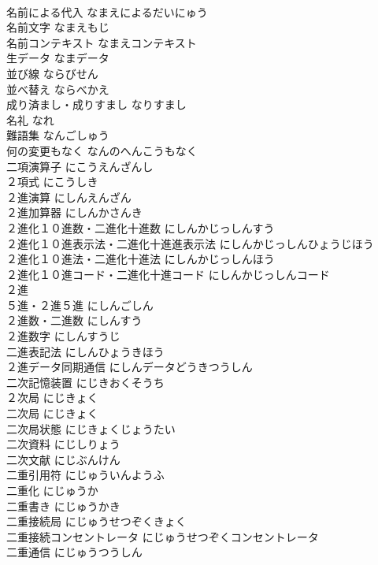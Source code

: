 \documentclass[8pt]{extreport}
\begin{document}
\begin{CJK}{UTF8}{min}
\\	名前による代入	なまえによるだいにゅう	
\\	名前文字	なまえもじ	
\\	名前コンテキスト	なまえコンテキスト	
\\	生データ	なまデータ	
\\	並び線	ならびせん	
\\	並べ替え	ならべかえ	
\\	成り済まし・成りすまし	なりすまし	
\\	名礼	なれ	
\\	難語集	なんごしゅう	
\\	何の変更もなく	なんのへんこうもなく	
\\	二項演算子	にこうえんざんし	
\\	２項式	にこうしき	
\\	２進演算	にしんえんざん	
\\	２進加算器	にしんかさんき	
\\	２進化１０進数・二進化十進数	にしんかじっしんすう	
\\	２進化１０進表示法・二進化十進進表示法	にしんかじっしんひょうじほう	
\\	２進化１０進法・二進化十進法	にしんかじっしんほう	
\\	２進化１０進コード・二進化十進コード	にしんかじっしんコード	
\\	２進
\\	５進・２進５進	にしんごしん	
\\	２進数・二進数	にしんすう	
\\	２進数字	にしんすうじ	
\\	二進表記法	にしんひょうきほう	
\\	２進データ同期通信	にしんデータどうきつうしん	
\\	二次記憶装置	にじきおくそうち	
\\	２次局	にじきょく	
\\	二次局	にじきょく	
\\	二次局状態	にじきょくじょうたい	
\\	二次資料	にじしりょう	
\\	二次文献	にじぶんけん	
\\	二重引用符	にじゅういんようふ	
\\	二重化	にじゅうか	
\\	二重書き	にじゅうかき	
\\	二重接続局	にじゅうせつぞくきょく	
\\	二重接続コンセントレータ	にじゅうせつぞくコンセントレータ	
\\	二重通信	にじゅうつうしん	

\end{CJK}
\end{document}
